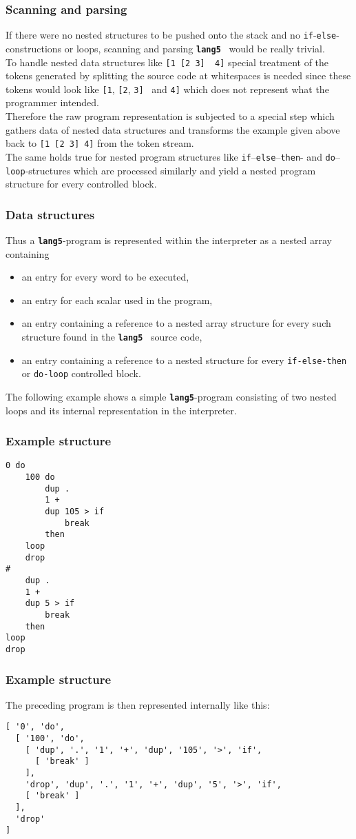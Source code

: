 \documentclass{beamer}
\newcommand*{\NIX}{\vspace*{.3cm}\\}
\newcommand*{\F}{{\tt\bf lang5}}
\begin{document}
  \begin{frame}
   \frametitle{Scanning and parsing}
   If there were no nested structures to be pushed onto the stack and no
   {\tt if}-{\tt else}-constructions or loops, scanning and parsing
   \F{ } would be really trivial.
   \NIX
   To handle nested data structures like {\tt [1 [2 3]{ } 4]} special treatment
   of the tokens generated by splitting the source code at whitespaces
   is needed since these tokens would look like 
   {\tt [1}, {\tt [2}, {\tt 3]}{ } and {\tt 4]}{ }
   which does not represent what the programmer intended.
   \NIX
   Therefore the raw program representation is subjected to a special step 
   which gathers data of nested data structures and transforms
   the example given above back to {\tt [1 [2 3] 4]} from the token stream.
   \NIX
   The same holds true for nested program structures like 
   {\tt if}--{\tt else}--{\tt then}- and 
   {\tt do}--{\tt loop}-structures
   which are processed similarly and yield a nested program structure for
   every controlled block.
  \end{frame}
%
  \begin{frame}
   \frametitle{Data structures}
   Thus a \F-program is represented within the interpreter as a nested array
   containing 
   \begin{itemize}
    \item an entry for every word to be executed,
    \item an entry for each scalar used in the program,
    \item an entry containing a reference to a nested array structure for
     every such structure found in the \F{ } source code,
    \item an entry containing a reference to a nested structure for every
     {\tt if-else-then} or {\tt do-loop} controlled block.
   \end{itemize}

   The following example shows a simple \F-program consisting of two nested
   loops and its internal representation in the interpreter.
  \end{frame}
%
  \begin{frame}[containsverbatim]
   \frametitle{Example structure}
   {\small 
    \begin{verbatim}
0 do
    100 do
        dup .
        1 +
        dup 105 > if
            break
        then
    loop
    drop
#
    dup .
    1 +
    dup 5 > if
        break
    then
loop
drop
    \end{verbatim}
   }
  \end{frame}
%
  \begin{frame}[containsverbatim]
   \frametitle{Example structure}
   The preceding program is then represented internally like this:
   {\small 
    \begin{verbatim}
[ '0', 'do',
  [ '100', 'do',
    [ 'dup', '.', '1', '+', 'dup', '105', '>', 'if',
      [ 'break' ]
    ],
    'drop', 'dup', '.', '1', '+', 'dup', '5', '>', 'if',
    [ 'break' ]
  ],
  'drop'
]
    \end{verbatim}
   }
  \end{frame}
%
\end{document}
